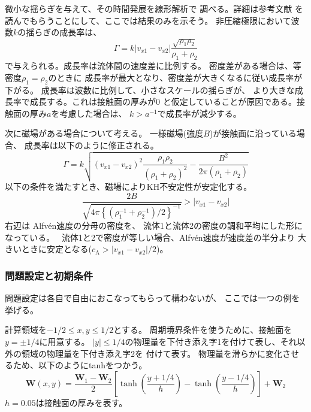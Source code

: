 微小な揺らぎを与えて、その時間発展を線形解析で
調べる。詳細は参考文献\citep{Chandrasekhar1961}
を読んでもらうことにして、ここでは結果のみを示そう。
非圧縮極限において波数$k$の揺らぎの成長率は、
\begin{equation}
\Gamma = k | v_{x1} - v_{x2} | 
\frac{\sqrt{\rho_1\rho_2}}{\rho_1 + \rho_2}
\end{equation}
で与えられる。成長率は流体間の速度差に比例する。
密度差がある場合は、等密度$\rho_1=\rho_2$のときに
成長率が最大となり、密度差が大きくなるに従い成長率が下がる。
成長率は波数に比例して、小さなスケールの揺らぎが、
より大きな成長率で成長する。これは接触面の厚みが0
と仮定していることが原因である。接触面の厚み$a$を考慮した場合は、
$k>a^{-1}$で成長率が減少する。


次に磁場がある場合について考える。
一様磁場(強度$B$)が接触面に沿っている場合、
成長率は以下のように修正される\citep[例えば][]{Chandrasekhar1961}。
\begin{equation}
\Gamma = k\sqrt{ ( v_{x1} - v_{x2} )^2 
\frac{{\rho_1\rho_2}}{(\rho_1 + \rho_2)^2} 
- \frac{B^2}{2\pi (\rho_1 + \rho_2)}
}
\end{equation}
以下の条件を満たすとき、磁場によりKH不安定性が安定化する。
\begin{equation}
    \frac{ 2B }{
    \sqrt{4\pi \left\{ (\rho_1^{-1} + \rho_2^{-1})/2\right\}^{-1}}}
    > | v_{x1} - v_{x2} | 
\end{equation}
右辺は
Alfv\'en速度の分母の密度を、
流体1と流体2の密度の調和平均にした形になっている。　
流体1と2で密度が等しい場合、Alfv\'en速度が速度差の半分より
大きいときに安定となる($c_\mathrm{A} > |v_{x1} - v_{x2}|/2$)。

\subsubsection{問題設定と初期条件}

問題設定は各自で自由におこなってもらって構わないが、
ここでは一つの例を挙げる。

計算領域を$-1/2\le x,y\le 1/2$とする。
周期境界条件を使うために、接触面を$y=\pm 1/4$に用意する。
$|y|\le 1/4$の物理量を下付き添え字1を付けて表し、それ以外の領域の物理量を下付き添え字2を
付けて表す。
物理量を滑らかに変化させるため、以下のようにtanhをつかう。
\begin{equation}
\bm{ W}(x,y) = \frac{\bm{ W}_1 - \bm{ W}_2}{2}
\left[ 
\tanh\left( \frac{y+1/4}{h} \right) 
-\tanh\left( \frac{y-1/4}{h} \right) 
\right]
+\bm{ W}_2
\label{kh_ini}
\end{equation}
$h=0.05$は接触面の厚みを表す。

